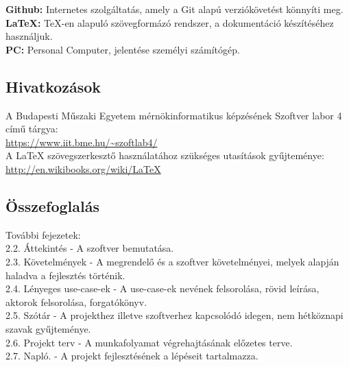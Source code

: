 \noindent\textbf{Github:} Internetes szolgáltatás, amely a Git alapú verziókövetést könnyíti meg.\\

\noindent\textbf{LaTeX:} TeX-en alapuló szövegformázó rendszer, a dokumentáció készítéséhez használjuk.\\

\noindent\textbf{PC:} Personal Computer, jelentése személyi számítógép.


\subsection{Hivatkozások}

A Budapesti Műszaki Egyetem mérnökinformatikus képzésének Szoftver labor 4 című tárgya:  \\
\url{https://www.iit.bme.hu/~szoftlab4/}\\

A LaTeX szövegszerkesztő használatához szükséges utasítások gyűjteménye:\\
\url{http://en.wikibooks.org/wiki/LaTeX}\\


\subsection{Összefoglalás}

 További fejezetek:\\

 2.2. Áttekintés - A szoftver bemutatása.\\

 2.3. Követelmények - A megrendelő és a szoftver követelményei, melyek alapján haladva a fejlesztés történik.\\

 2.4. Lényeges use-case-ek - A use-case-ek nevének felsorolása, rövid leírása, aktorok felsorolása, forgatókönyv.\\

 2.5. Szótár - A projekthez illetve szoftverhez kapcsolódó idegen, nem hétköznapi szavak gyűjteménye.\\

 2.6. Projekt terv - A munkafolyamat végrehajtásának előzetes terve.\\

 2.7. Napló. - A projekt fejlesztésének a lépéseit tartalmazza.